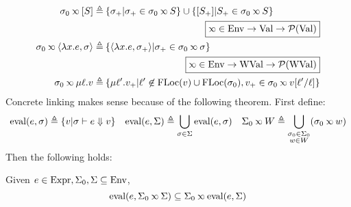 \begin{align*}
  \ctx_0\semlink[\event]\triangleq                       & \: \{\ctx_+|\ctx_+\in\ctx_0\semlink\event\}\cup\{[\event_+]|\event_+\in\ctx_0\semlink\event\}                                      \\
                                                         & \pushright{\fbox{$\semlink\in\Ctx\rightarrow\Value\rightarrow\pset{\Value}$}}                                                      \\
  \ctx_0\semlink\langle\lambda x.e,\ctx\rangle\triangleq & \: \{\langle\lambda x.e,\ctx_+\rangle|\ctx_+\in\ctx_0\semlink\ctx\}                                                                \\
                                                         & \pushright{\fbox{$\semlink\in\Ctx\rightarrow\Walue\rightarrow\pset{\Walue}$}}                                                      \\
  \ctx_0\semlink\mu\ell.v\triangleq                      & \: \{\mu\ell'.v_+|\ell'\not\in\FLoc(v)\cup\FLoc(\ctx_0), v_+\in\ctx_0\semlink v[\ell'/\ell]\}
\end{align*}
Concrete linking makes sense because of the following theorem.
First define:
\[
  \eval(e,\ctx)\triangleq\{v|\ctx\vdash e\Downarrow v\}\quad
  \eval(e,\Sigma)\triangleq\bigcup_{\ctx\in\Sigma}\eval(e,\ctx)\quad
  \Sigma_0\semlink W\triangleq\bigcup_{\substack{\ctx_0\in\Sigma_0\\w\in W}}(\ctx_0\semlink w)
\]
Then the following holds:
\begin{thm}[Advance]\label{thm:linksound}
  Given $e\in\textnormal{Expr},\Sigma_0,\Sigma\subseteq\textnormal{Env}$,
  \[\eval(e,\Sigma_0\semlink\Sigma)\subseteq\Sigma_0\semlink\eval(e,\Sigma)\]
\end{thm}


